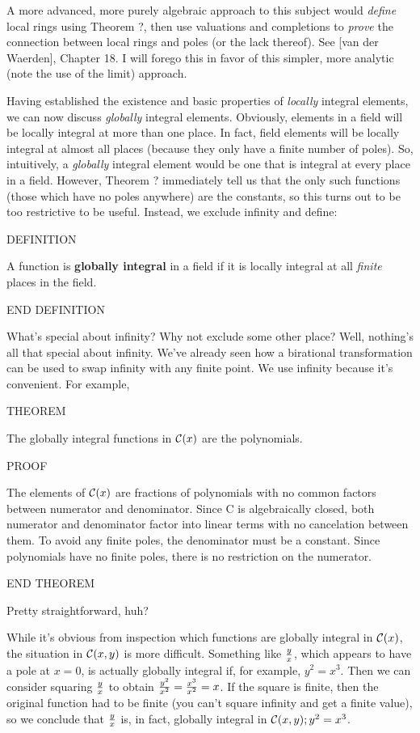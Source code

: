 A more advanced, more purely algebraic approach to this subject would
{\it define} local rings using Theorem ?, then use valuations and
completions to {\it prove} the connection between local rings and
poles (or the lack thereof).  See [van der Waerden], Chapter 18.  I
will forego this in favor of this simpler, more analytic (note the use
of the limit) approach.


Having established the existence and basic properties of {\it locally}
integral elements, we can now discuss {\it globally} integral
elements.  Obviously, elements in a field will be locally integral at
more than one place.  In fact, field elements will be locally integral
at almost all places (because they only have a finite number of
poles).  So, intuitively, a {\it globally} integral element would be
one that is integral at every place in a field.  However, Theorem ?
immediately tell us that the only such functions (those which have no
poles anywhere) are the constants, so this turns out to be too
restrictive to be useful.  Instead, we exclude infinity and define:

DEFINITION

A function is {\bf globally integral} in a field if it is locally
integral at all {\it finite} places in the field.

END DEFINITION

What's special about infinity?  Why not exclude some other place?
Well, nothing's all that special about infinity.  We've already seen
how a birational transformation can be used to swap infinity with any
finite point.  We use infinity because it's convenient.  For example,

THEOREM

The globally integral functions in ${\cal C}(x)$ are the polynomials.

PROOF

The elements of ${\cal C}(x)$ are fractions of polynomials with no
common factors between numerator and denominator.  Since {\cal C} is
algebraically closed, both numerator and denominator factor into
linear terms with no cancelation between them.  To avoid any finite
poles, the denominator must be a constant.  Since polynomials
have no finite poles, there is no restriction on the numerator.

END THEOREM

Pretty straightforward, huh?

While it's obvious from inspection which functions are globally
integral in ${\cal C}(x)$, the situation in ${\cal C}(x,y)$ is more
difficult.  Something like $y \over x$, which appears to have a pole
at $x=0$, is actually globally integral if, for example, $y^2=x^3$.
Then we can consider squaring $y \over x$ to obtain ${y^2 \over x^2} =
{x^3 \over x^2} = x$.  If the square is finite, then the original
function had to be finite (you can't square infinity and get a
finite value), so we conclude that $y \over x$ is, in fact,
globally integral in ${\cal C}(x,y); y^2=x^3$.

